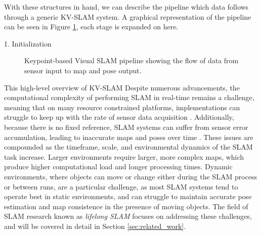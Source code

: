 With these structures in hand, we can describe the pipeline which data follows through a generic KV-SLAM system. A graphical representation of the pipeline can be seen in Figure \ref{fig:kv_slam_pipeline}, each stage is expanded on here.

1. Initialization

\begin{figure}[!ht]
    \centering
    \caption{Keypoint-based Visual SLAM pipeline showing the flow of data from sensor input to map and pose output.}
    \label{fig:kv_slam_pipeline}
\end{figure}

This high-level overview of KV-SLAM Despite numerous advancements, the computational complexity of performing SLAM in real-time remains a challenge, meaning that on many resource constrained platforms, implementations can struggle to keep up with the rate of sensor data acquisition \cite{semenovaQuantitativeAnalysisSystem2022}. Additionally, because there is no fixed reference, SLAM systems can suffer from sensor error accumulation, leading to inaccurate maps and poses over time \cite{cadenaPresentFutureSimultaneous2016}. These issues are compounded as the timeframe, scale, and environmental dynamics of the SLAM task increase. Larger environments require larger, more complex maps, which produce higher computational load and longer processing times. Dynamic environments, where objects can move or change either during the SLAM process or between runs, are a particular challenge, as most SLAM systems tend to operate best in static environments, and can struggle to maintain accurate pose estimation and map consistence in the presence of moving objects. The field of SLAM research known as \textit{lifelong SLAM} \cite{cadenaPresentFutureSimultaneous2016} focuses on addressing these challenges, and will be covered in detail in Section \ref{sec:related_work}.
